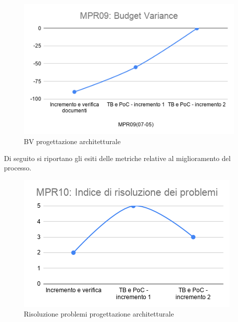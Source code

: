 \begin{figure}[h!]
	\centering
	\includegraphics[scale=0.6]{Immagini/BV_PArchitetturale.png}
	\caption{BV progettazione architetturale}
	\label{fig:BV_PArchitetturale}
\end{figure}
Di seguito si riportano gli esiti delle metriche relative al miglioramento del processo.
\begin{figure}[h!]
	\centering
	\includegraphics[scale=0.6]{Immagini/MPR10_rproblemi.png}
	\caption{Risoluzione problemi progettazione architetturale}
	\label{fig:MPR10}
\end{figure}